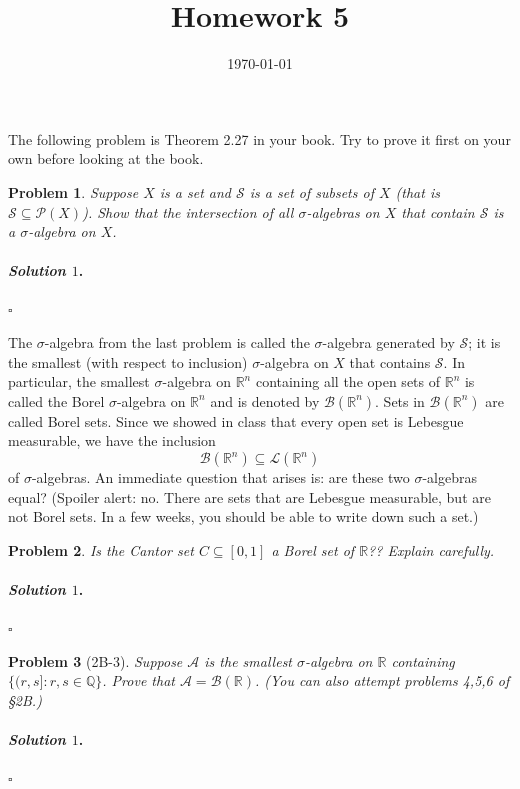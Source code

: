 \documentclass[reqno]{amsart}
\theoremstyle{plain}
\newtheorem{problem}{Problem}
\theoremstyle{definition}
\newenvironment{solution1}{\paragraph{\emph{Solution $1$}.}}{\hfill$\square$}
\begin{document}
 

\title[Homework 5]{Homework 5}

\date{\today} 
\maketitle 


The following problem is Theorem 2.27 in your book.  Try to prove it first on your own before looking at the book.
\begin{problem}
Suppose $X$ is a set and $\mathcal{S}$ is a set of subsets of $X$ (that is $\mathcal{S} \subseteq \mathcal{P}(X)$).  Show that the intersection of all $\sigma$-algebras on $X$ that contain $\mathcal{S}$ is a $\sigma$-algebra on $X$.
\end{problem}
\begin{solution1}

\end{solution1}

The $\sigma$-algebra from the last problem is called the $\sigma$-algebra generated by $\mathcal{S}$; it is the smallest (with respect to inclusion) $\sigma$-algebra on $X$ that contains $\mathcal{S}$.  In particular, the smallest $\sigma$-algebra on $\mathbb{R}^{n}$ containing all the open sets of $\mathbb{R}^{n}$ is called the Borel $\sigma$-algebra on $\mathbb{R}^{n}$ and is denoted by $\mathcal{B}(\mathbb{R}^{n})$.  Sets in $\mathcal{B}(\mathbb{R}^{n})$ are called Borel sets.  Since we showed in class that every open set is Lebesgue measurable, we have the inclusion
$$\mathcal{B}(\mathbb{R}^{n}) \subseteq \mathcal{L}(\mathbb{R}^{n}) $$
of $\sigma$-algebras.  An immediate question that arises is:  are these two $\sigma$-algebras equal?  (Spoiler alert:  no.  There are sets that are Lebesgue measurable, but are not Borel sets.  In a few weeks, you should be able to write down such a set.)
\begin{problem}
Is the Cantor set $C \subseteq [0,1]$ a Borel set of $\mathbb{R}$??  Explain carefully.
\end{problem}
\begin{solution1}

\end{solution1}


\begin{problem}[2B-3]
Suppose $\mathcal{A}$ is the smallest $\sigma$-algebra on $\mathbb{R}$ containing $\{(r,s] : r,s \in \mathbb{Q} \}$.  Prove that $\mathcal{A} = \mathcal{B}(\mathbb{R})$.  (You can also attempt problems 4,5,6 of \S2B.)
\end{problem}
\begin{solution1}

\end{solution1}
\end{document}
